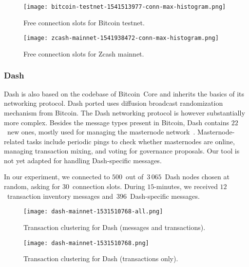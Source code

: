 \begin{figure*}
	\centering
	\begin{minipage}{0.5\textwidth}
		\centering
		\texttt{[image: bitcoin-testnet-1541513977-conn-max-histogram.png]}
		\caption{Free connection slots for Bitcoin testnet.}
		\label{fig:free-slots-bitcoin}
	\end{minipage}\hfill
	\begin{minipage}{0.5\textwidth}
		\centering
		\texttt{[image: zcash-mainnet-1541938472-conn-max-histogram.png]}
		\caption{Free connection slots for Zcash mainnet.}
		\label{fig:free-slots-zcash}
	\end{minipage}\hfill
\end{figure*}


\subsubsection{Dash}

Dash is also based on the codebase of Bitcoin~Core and inherits the basics of its networking protocol.
Dash ported uses diffusion broadcast randomization mechanism from Bitcoin.
The Dash networking protocol is however substantially more complex.
Besides the message types present in Bitcoin, Dash contains $22$~new ones, mostly used for managing the masternode network~\cite{Schinzel2015}.
Masternode-related tasks include periodic pings to check whether masternodes are online, managing transaction mixing, and voting for governance proposals.
Our tool is not yet adapted for handling Dash-specific messages.

In our experiment, we connected to $500$~out of~$3\,065$~Dash nodes chosen at random, asking for $30$~connection slots.
During $15$-minutes, we received $12$~transaction inventory messages and~$396$~Dash-specific messages.

\begin{figure*}
	\centering
	\begin{minipage}{0.5\textwidth}
		\centering
		\texttt{[image: dash-mainnet-1531510768-all.png]}
		\caption{Transaction clustering for Dash (messages and transactions).}
		\label{fig:dash-all}
	\end{minipage}\hfill
	\begin{minipage}{0.5\textwidth}
		\centering
		\texttt{[image: dash-mainnet-1531510768.png]}
		\caption{Transaction clustering for Dash (transactions only).}
		\label{fig:dash-tx}
	\end{minipage}\hfill
\end{figure*}

